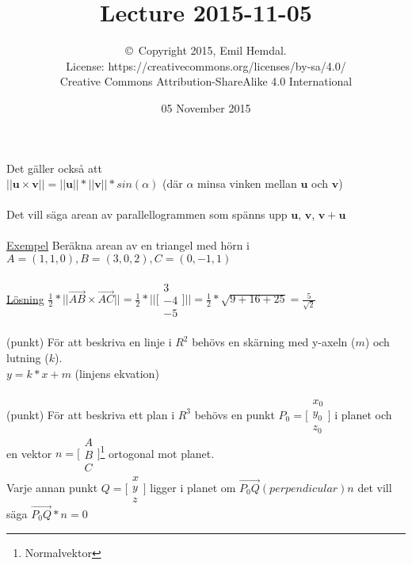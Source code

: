 \documentclass{article}
\title{Lecture 2015-11-05}
\author{\copyright~Copyright 2015, Emil Hemdal.\\
   License: https://creativecommons.org/licenses/by-sa/4.0/\\
   Creative Commons Attribution-ShareAlike 4.0 International}
\date{05 November 2015}
\begin{document}
\maketitle


Det gäller också att\\
\(||\mathbf{u}\times \mathbf{v}|| = ||\mathbf{u}||*||\mathbf{v}||*sin(\alpha)\) (där \(\alpha\) minsa vinken mellan \(\mathbf{u}\) och \(\mathbf{v}\))\\
\\
Det vill säga arean av parallellogrammen som spänns upp \(\mathbf{u}\), \(\mathbf{v}\), \(\mathbf{v}+\mathbf{u}\)\\
\\
\underline{Exempel} Beräkna arean av en triangel med hörn i \(A = (1, 1, 0), B = (3, 0, 2), C = (0, -1, 1)\)\\
\\
\underline{Lösning} \(\frac{1}{2}*||\vec{AB} \times \vec{AC}|| = \frac{1}{2} * || \bigl[\begin{smallmatrix}
3 \\ -4 \\ -5
\end{smallmatrix} \bigr] || = \frac{1}{2} * \sqrt{9 + 16 + 25} = \frac{5}{\sqrt{2}} \)\\
\\
(punkt) För att beskriva en linje i \(R^2\) behövs en skärning med y-axeln (\(m\)) och lutning (\(k\)).\\
\(y=k*x+m\) (linjens ekvation)\\
\\
(punkt) För att beskriva ett plan i \(R^3\) behövs en punkt \(P_0 = \bigl[\begin{smallmatrix}
x_0 \\ y_0 \\ z_0
\end{smallmatrix} \bigr] \) i planet och en vektor \(n = \bigl[\begin{smallmatrix}
A \\ B \\ C
\end{smallmatrix} \bigr] \)\footnote{Normalvektor} ortogonal mot planet.\\
Varje annan punkt \(Q = \bigl[\begin{smallmatrix}
x \\ y \\ z
\end{smallmatrix} \bigr] \) ligger i planet om \(\vec{P_0 Q} (perpendicular) n \) det vill säga \(\vec{P_0 Q} * n = 0 \)\\
\end{document}

